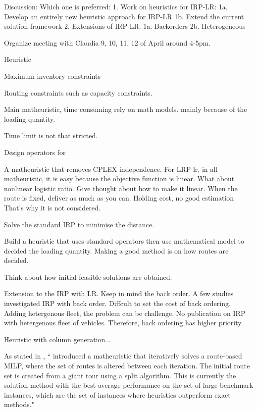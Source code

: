 \documentclass{article}
\begin{document}
Discussion: 
Which one is preferred: 
 1. Work on heuristics for IRP-LR: 
    1a. Develop an entirely new heuristic approach for IRP-LR
    1b. Extend the current solution framework
 2. Extensions of IRP-LR:
    1a. Backorders
    2b. Heterogeneous 

Organize meeting with Claudia 9, 10, 11, 12 of April around 4-5pm.

Heuristic

Maximum inventory constraints

Routing constraints such as capacity constraints. 

Main matheuristic, time consuming rely on math models. mainly because of the loading quantity. 

Time limit is not that stricted. 

Design operators for 

A matheuristic that removes CPLEX independence. For LRP lr, in all matheuristic, it is easy because the objective function is linear. What about nonlinear logistic ratio. Give thought about how to make it linear. When the route is fixed, deliver as much as you can. Holding cost, no good estimation That's why it is not considered. 

Solve the standard IRP to minimise the distance. 

Build a heuristic that uses standard operators then use mathematical model to decided the loading quantity. Making a good method is on how routes are decided. 

Think about how initial feasible solutions are obtained. 

Extension to the IRP with LR. Keep in mind the back order. A few studies investigated IRP with back order. Diffcult to set the cost of back ordering. Adding hetergenous fleet, the problem can be challenge. No publication on IRP with hetergenous fleet of vehicles. Therefore, back ordering has higher priority. 






Heuristic with column generation... 

As stated in \cite{skaalnes2023branch}, ``\cite{vadseth2023multi} introduced a matheuristic that iteratively solves a route-based MILP, where the set of routes is altered between each iteration. The initial route set is created from a giant tour using a split algorithm. This is currently the solution method with the best average performance on the set of large benchmark instances, which are the set of instances where heuristics outperform exact methods."
\end{document}
